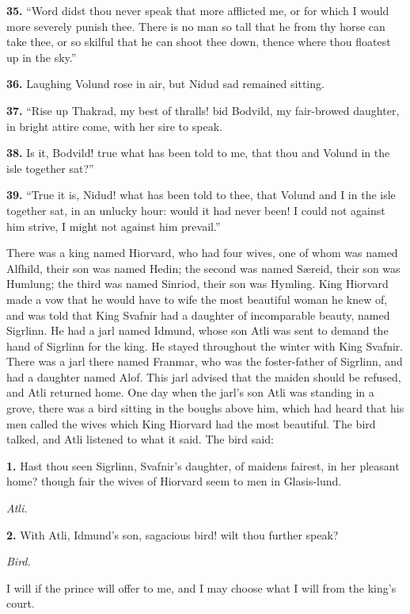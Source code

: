 \textbf{35.} ``Word didst thou never speak that more afflicted me, or for
which I would more severely punish thee. There is no man so tall that
he from thy horse can take thee, or so skilful that he can shoot thee
down, thence where thou floatest up in the sky.''

\textbf{36.} Laughing Volund rose in air, but Nidud sad remained sitting.

\textbf{37.} ``Rise up Thakrad, my best of thralls! bid Bodvild, my
fair-browed daughter, in bright attire come, with her sire to speak.

\textbf{38.} Is it, Bodvild! true what has been told to me, that thou and
Volund in the isle together sat?''

\textbf{39.} ``True it is, Nidud! what has been told to thee, that Volund and
I in the isle together sat, in an unlucky hour: would it had never
been! I could not against him strive, I might not against him
prevail.''


There was a king named Hiorvard, who had four wives, one of whom was
named Alfhild, their son was named Hedin; the second was named Særeid,
their son was Humlung; the third was named Sinriod, their son was
Hymling. King Hiorvard made a vow that he would have to wife the most
beautiful woman he knew of, and was told that King Svafnir had a
daughter of incomparable beauty, named Sigrlinn. He had a jarl named
Idmund, whose son Atli was sent to demand the hand of Sigrlinn for the
king. He stayed throughout the winter with King Svafnir. There was a
jarl there named Franmar, who was the foster-father of Sigrlinn, and
had a daughter named Alof. This jarl advised that the maiden should be
refused, and Atli returned home. One day when the jarl's son Atli was
standing in a grove, there was a bird sitting in the boughs above him,
which had heard that his men called the wives which King Hiorvard had
the most beautiful. The bird talked, and Atli listened to what it
said. The bird said:

\textbf{1.} Hast thou seen Sigrlinn, Svafnir's daughter, of maidens fairest,
in her pleasant home? though fair the wives of Hiorvard seem to men in
Glasis-lund.

\emph{Atli.}

\textbf{2.} With Atli, Idmund's son, sagacious bird! wilt thou further speak?

\emph{Bird.}

I will if the prince will offer to me, and I may choose what I will
from the king's court.

